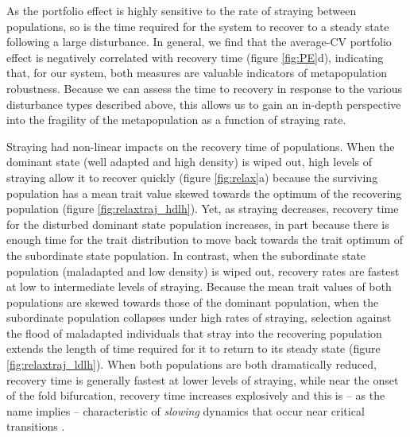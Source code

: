 \documentclass[twocolumn,preprintnumbers,amsmath,amssymb,superscriptaddress]{revtex4}
\begin{document}
As the portfolio effect is highly sensitive to the rate of straying between populations, so is the time required for the system to recover to a steady state following a large disturbance.
In general, we find that the average-CV portfolio effect is negatively correlated with recovery time (figure \ref{fig:PE}d), indicating that, for our system, both measures are valuable indicators of metapopulation robustness.
Because we can assess the time to recovery in response to the various disturbance types described above, this allows us to gain an in-depth perspective into the fragility of the metapopulation as a function of straying rate.


Straying had non-linear impacts on the recovery time of populations. 
When the dominant state (well adapted and high density) is wiped out, high levels of straying allow it to recover quickly (figure \ref{fig:relax}a) because the surviving population has a mean trait value skewed towards the optimum of the recovering population (figure \ref{fig:relaxtraj_hdlh}).
Yet, as straying decreases, recovery time for the disturbed dominant state population increases, in part because there is enough time for the trait distribution to move back towards the trait optimum of the subordinate state population.
In contrast, when the subordinate state population (maladapted and low density) is wiped out, recovery rates are fastest at low to intermediate levels of straying.
Because the mean trait values of both populations are skewed towards those of the dominant population, when the subordinate population collapses under high rates of straying, selection against the flood of maladapted individuals that stray into the recovering population extends the length of time required for it to return to its steady state (figure \ref{fig:relaxtraj_ldlh}).
When both populations are both dramatically reduced, recovery time is generally fastest at lower levels of straying, while near the onset of the fold bifurcation, recovery time increases explosively and this is -- as the name implies -- characteristic of \emph{slowing} dynamics that occur near critical transitions \cite{Scheffer:2009gg,Kuehn:2010p2591}.
\end{document}
